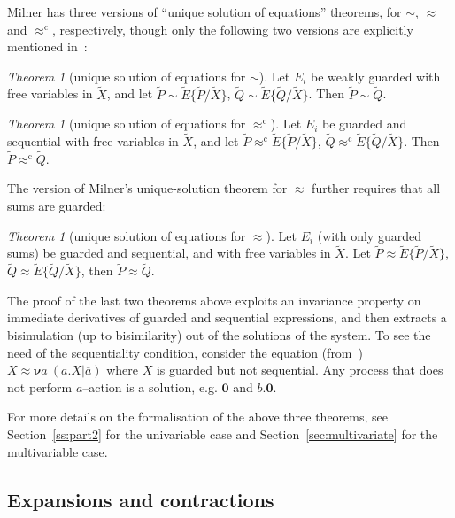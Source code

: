 \documentclass[GCNS]{yincog}
\theoremstyle{remark}
\theoremstyle{theorem}
\newtheorem{theorem}[definition]{Theorem}
\theoremstyle{remark}
\newcommand{\univariate}{univariable\xspace}
\newcommand{\multivariate}{multivariable\xspace}
\def\nil{{\boldsymbol 0}}
\def\res#1{{\boldsymbol \nu} #1\:}
\newcommand{\outC}[1]{\overline{#1}}
\renewcommand{\tilde}{\widetilde}
\newcommand{\rapprox}{\mathrel{\approx^{\mathrm{c}}}}
\newcommand{\wbvtex}{\approx}
\newcommand{\til}{\tilde}
\begin{document}
Milner has three versions of ``unique solution of equations'' theorems,
for $\sim $, $\wbvtex $ and $\rapprox $, respectively, though only the
following two versions are explicitly mentioned in~\citep[p.~103, 158]{Mil89}:
%
\begin{theorem}[unique solution of equations for $\sim $]
 \label{t:Mil89s1}
Let $E_i$ be weakly guarded with free variables in $\til X$, and let
${\til P} \sim {\til E}\{\til P /\til X\}$,
${\til Q} \sim {\til E}\{\til Q /\til X\}$. Then
${\til P} \sim {\til Q}$.
\end{theorem}

\begin{theorem}[unique solution of equations for $\rapprox $]
 \label{t:Mil89s3}
Let $E_i$ be guarded and sequential with free variables in $\til X$, and
let ${\til P} \rapprox {\til E}\{\til P /\til X\}$,
${\til Q} \rapprox {\til E}\{\til Q /\til X\}$. Then
${\til P} \rapprox {\til Q}$.
\end{theorem}

The version of Milner's unique-solution theorem for $\wbvtex $ further
requires that all sums are guarded:
%
\begin{theorem}[unique solution of equations for $\wbvtex $]
 \label{t:Mil89}
Let $E_i$ (with only guarded sums) be guarded and sequential, and with
free variables in $\til X$. Let
${\til P} \wbvtex {\til E}\{\til P /\til X\}$,
${\til Q} \wbvtex {\til E}\{\til Q /\til X\}$, then
${\til P} \wbvtex {\til Q}$.
\end{theorem}

The proof of the last two theorems above exploits an invariance property
on immediate derivatives of guarded and sequential expressions, and then
extracts a bisimulation (up to bisimilarity) out of the solutions of the
system. To see the need of the sequentiality condition, consider the equation
(from~\cite{Mil89}) $X \wbvtex \res a (a. X | \outC a)$ where $X$ is guarded
but not sequential. Any process that does not perform $a$--action is a
solution, e.g. $\nil $ and $b.\nil $.

For more details on the formalisation of the above three theorems, see
Section~\ref{ss:part2} for the \univariate case and Section~\ref{sec:multivariate}
for the \multivariate case.

\subsection{Expansions and contractions}
 \label{s:mcontr}
\end{document}
